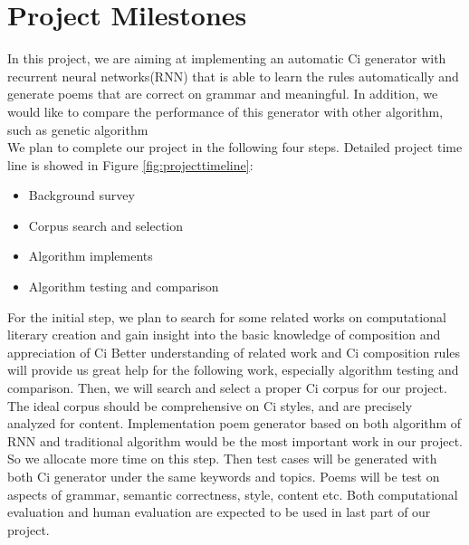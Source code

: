 \section{Project Milestones}
In this project, we are aiming at implementing an automatic Ci generator with recurrent neural networks(RNN) that is able to learn the rules automatically and generate poems that are correct on grammar and meaningful. In addition, we would like to compare the performance of this generator with other algorithm, such as genetic algorithm\\

We plan to complete our project in the following four steps. Detailed project time line is showed in Figure \ref{fig:projecttimeline}:
\begin{itemize}
\item Background survey
\item Corpus search and selection
\item Algorithm implements
\item Algorithm testing and comparison
\end{itemize}



For the initial step, we plan to search for some related works on computational literary creation and gain insight into the basic knowledge of composition and appreciation of Ci Better understanding of related work and Ci composition rules will provide us great help for the following work, especially algorithm testing and comparison. Then, we will search and select a proper Ci corpus for our project. The ideal corpus should be comprehensive on Ci styles, and are precisely analyzed for content. Implementation poem generator based on both algorithm of RNN and traditional algorithm would be the most important work in our project. So we allocate more time on this step. Then test cases will be generated with both Ci generator under the same keywords and topics. Poems will be test on aspects of grammar, semantic correctness, style, content etc. Both computational evaluation and human evaluation are expected to be used in last part of our project.

